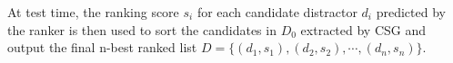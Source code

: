 
At test time, the ranking score $s_i$ for each candidate distractor $d_i$ 
predicted by the ranker is then used to sort the candidates in 
$D_0$ extracted by CSG and output the final n-best ranked list 
$D = \{(d_1, s_1), (d_2, s_2), \cdots, (d_n, s_n) \}$.
